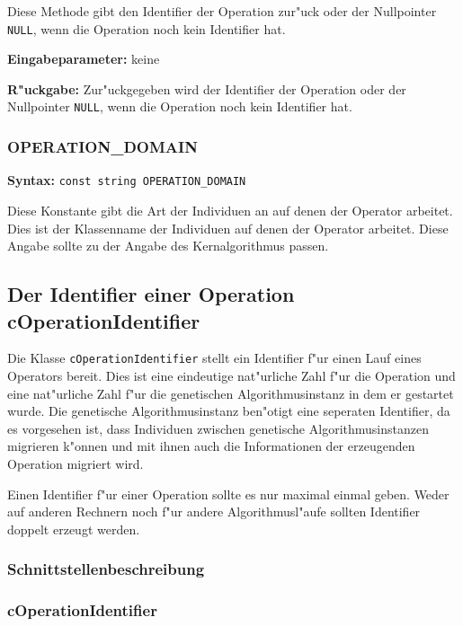 Diese Methode gibt den Identifier der Operation zur"uck oder der Nullpointer \verb|NULL|, wenn die Operation noch kein Identifier hat.

\bigskip\noindent
\textbf{Eingabeparameter:} keine

\bigskip\noindent
\textbf{R"uckgabe:} Zur"uckgegeben wird der Identifier der Operation oder der Nullpointer \verb|NULL|, wenn die Operation noch kein Identifier hat.


\subsubsection{OPERATION\_DOMAIN}

\textbf{Syntax:} \verb|const string OPERATION_DOMAIN|

Diese Konstante gibt die Art der Individuen an auf denen der Operator arbeitet. Dies ist der Klassenname der Individuen auf denen der Operator arbeitet. Diese Angabe sollte zu der Angabe des Kernalgorithmus passen.



\subsection{Der Identifier einer Operation cOperationIdentifier}
\label{secCOperationIdentifier}

Die Klasse \verb|cOperationIdentifier| stellt ein Identifier f"ur einen Lauf eines Operators bereit. Dies ist eine eindeutige nat"urliche Zahl f"ur die Operation und eine nat"urliche Zahl f"ur die genetischen Algorithmusinstanz in dem er gestartet wurde. Die genetische Algorithmusinstanz ben"otigt eine seperaten Identifier, da es vorgesehen ist, dass Individuen zwischen genetische Algorithmusinstanzen migrieren k"onnen und mit ihnen auch die Informationen der erzeugenden Operation migriert wird.

Einen Identifier f"ur einer Operation sollte es nur maximal einmal geben. Weder auf anderen Rechnern noch f"ur andere Algorithmusl"aufe sollten Identifier doppelt erzeugt werden.


\subsubsection{Schnittstellenbeschreibung}


\subsubsection{cOperationIdentifier}

